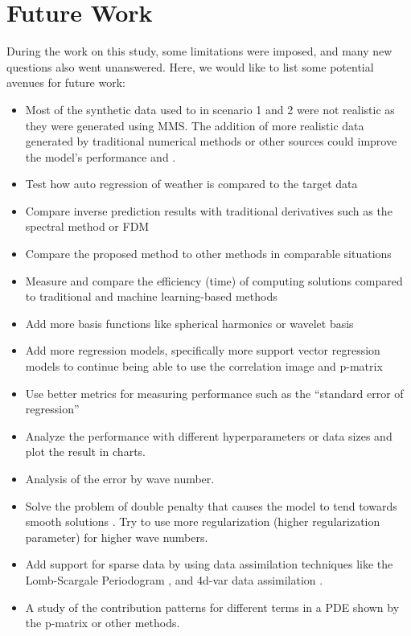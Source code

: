 \section{Future Work}
During the work on this study, some limitations were imposed, and many new questions also went unanswered. Here, we would like to list some potential avenues for future work:
\begin{itemize}
    \item Most of the synthetic data used to in scenario 1 and 2 were not realistic as they were generated using MMS. The addition of more realistic data generated by traditional numerical methods or other sources could improve the model's performance and .
    \item Test how auto regression of weather is compared to the target data
    \item Compare inverse prediction results with traditional derivatives such as the spectral method or FDM
    \item Compare the proposed method to other methods in comparable situations
    \item Measure and compare the efficiency (time) of computing solutions compared to traditional and machine learning-based methods
    \item Add more basis functions like spherical harmonics or wavelet basis
    \item Add more regression models, specifically more support vector regression models to continue being able to use the correlation image and p-matrix
    \item Use better metrics for measuring performance such as the \enquote{standard error of regression}
    \item Analyze the performance with different hyperparameters or data sizes and plot the result in charts.
    \item Analysis of the error by wave number.
    \item Solve the problem of double penalty that causes the model to tend towards smooth solutions \autocite{brownForecastsSpatialFields2011,NIPS2017_44a2e080}. Try to use more regularization (higher regularization parameter) for higher wave numbers.
    \item Add support for sparse data by using data assimilation techniques like the Lomb-Scargale Periodogram \autocite{vanderplasUnderstandingLombScargle2018}, and 4d-var data assimilation \autocite{puNumericalWeatherPrediction2018,parkDataAssimilationAtmospheric2013}.
    \item A study of the contribution patterns for different terms in a PDE shown by the p-matrix or other methods.
\end{itemize}
